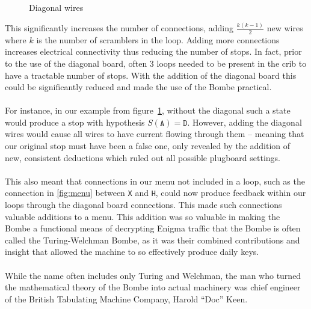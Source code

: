 \begin{figure}[H]
\begin{center}
  \end{center}
  \caption{Diagonal wires}
  \label{fig:diagonal}
\end{figure}
\noindent This significantly increases the number of connections,
adding $\frac{k(k-1)}{2}$ new wires where $k$ is the number of
scramblers in the loop. Adding more connections increases electrical
connectivity thus reducing the number of stops. In fact, prior to the
use of the diagonal board, often $3$ loops needed to be present in
the crib to have a tractable number of stops. With the addition of
the diagonal board this could be significantly reduced and made the
use of the Bombe practical.
\\\\For instance, in our example from figure~\ref{fig:diagonal},
without the diagonal such a state would produce a stop with
hypothesis $S(\texttt{A}) = \texttt{D}$. However, adding the diagonal
wires would cause all wires to have current flowing through them --
meaning that our original stop must have been a false one, only
revealed by the addition of new, consistent deductions which ruled
out all possible plugboard settings.
\\\\This also meant that connections in our menu not included in a
loop, such as the connection in \ref{fig:menu} between \texttt{X} and
\texttt{H}, could now produce feedback within our loops through the
diagonal board connections. This made such connections valuable
additions to a menu. This addition was so valuable in making the
Bombe a functional means of decrypting Enigma traffic that the Bombe
is often called the Turing-Welchman Bombe, as it was their combined
contributions and insight that allowed the machine to so effectively
produce daily keys.
\\\\While the name often includes only Turing and Welchman, the man
who turned the mathematical theory of the Bombe into actual machinery
was chief engineer of the British Tabulating Machine Company, Harold
``Doc'' Keen.


